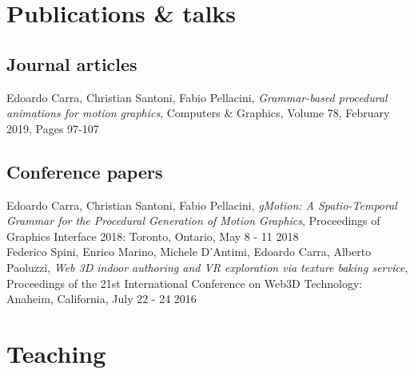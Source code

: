 \documentclass[11pt, a4paper]{article} %
\newcommand{\years}[1]{\marginnote{\scriptsize #1}} %
\begin{document}
\section*{Publications \& talks}

\subsection*{Journal articles}

\years{2019} Edoardo Carra, Christian Santoni, Fabio Pellacini, \emph{Grammar-based procedural animations for motion graphics}, Computers \& Graphics, Volume 78, February 2019, Pages 97-107\\


\subsection*{Conference papers}

\years{2018} Edoardo Carra, Christian Santoni, Fabio Pellacini, \emph{gMotion: A Spatio-Temporal Grammar for the Procedural Generation of Motion Graphics}, Proceedings of Graphics Interface 2018: Toronto, Ontario, May 8 - 11 2018\\
\years{2016} Federico Spini, Enrico Marino, Michele D'Antimi, Edoardo Carra, Alberto Paoluzzi, \emph{Web 3D indoor authoring and VR exploration via texture baking service}, Proceedings of the 21st International Conference on Web3D Technology: Anaheim, California, July 22 - 24 2016\\





\section*{Teaching}
\end{document}
